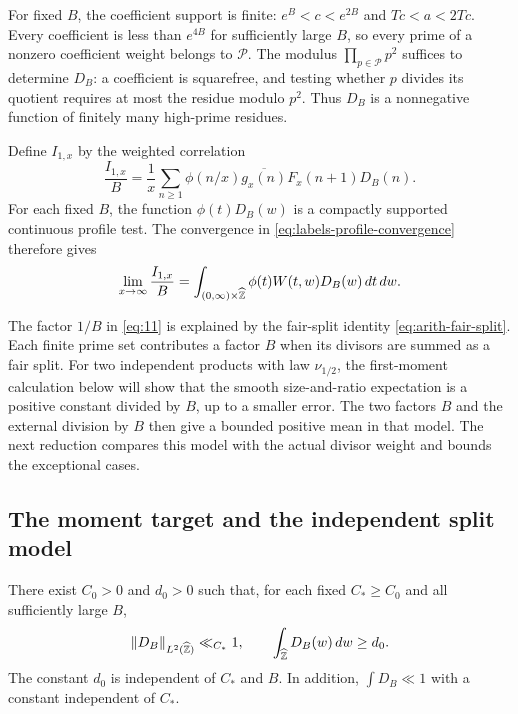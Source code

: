 For fixed $B$, the coefficient support is finite:
$e^B<c<e^{2B}$ and $Tc<a<2Tc$. Every coefficient is less than
$e^{4B}$ for sufficiently large $B$, so every prime of a nonzero
coefficient weight belongs to $\mathcal P$. The modulus
$\prod_{p\in\mathcal P}p^2$ suffices to determine $D_B$: a coefficient
is squarefree, and testing whether $p$ divides its quotient requires
at most the residue modulo $p^2$. Thus $D_B$ is a nonnegative function
of finitely many high-prime residues.

Define $I_{1,x}$ by the weighted correlation
\begin{equation}\label{eq:amp-weighted-correlation}
 \frac{I_{1,x}}B
 =\frac1x\sum_{n\ge1}
   \phi(n/x)\overline{g_x(n)}F_x(n+1)D_B(n).
\end{equation}
For each fixed $B$, the function $\phi(t)D_B(w)$ is a compactly
supported continuous profile test. The convergence in
\eqref{eq:labels-profile-convergence} therefore gives
\begin{equation}\label{eq:amp-profile-limit}
 \lim_{x\to\infty}\frac{I_{1,x}}B
 =\int_{(0,\infty)\times\widehat{\mathbb Z}}
   \phi(t)W(t,w)D_B(w)\,dt\,dw.
\end{equation}

The factor $1/B$ in \eqref{eq:11} is explained by the fair-split
identity \eqref{eq:arith-fair-split}. Each finite prime set contributes
a factor $B$ when its divisors are summed as a fair split. For two
independent products with law $\nu_{1/2}$, the first-moment calculation
below will show that the smooth size-and-ratio expectation is a positive
constant divided by $B$, up to a smaller error. The two factors $B$ and
the external division by $B$ then give a bounded positive mean in that
model. The next reduction compares this model with the actual divisor
weight and bounds the exceptional cases.

\subsection{The moment target and the independent split model}

\begin{lemma}\label{lem:amp-divisor-moments}
There exist $C_0>0$ and $d_0>0$ such that, for each fixed
$C_*\ge C_0$ and all sufficiently large $B$,
\begin{equation}\label{eq:12}
 \|D_B\|_{L^2(\widehat{\mathbb Z})}\ll_{C_*}1,
 \qquad
 \int_{\widehat{\mathbb Z}}D_B(w)\,dw\ge d_0.
\end{equation}
The constant $d_0$ is independent of $C_*$ and $B$.  In addition,
$\int D_B\ll1$ with a constant independent of $C_*$.
\end{lemma}

